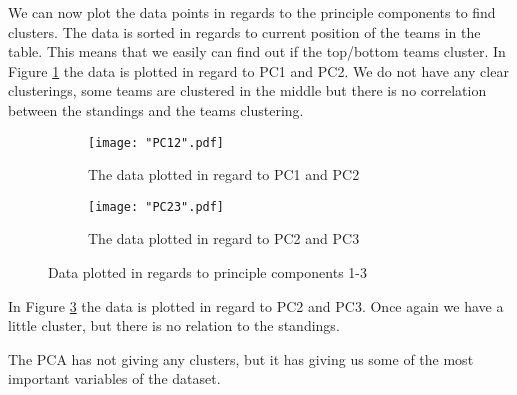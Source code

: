 \documentclass[Report.tex]{subfiles}
\begin{document}
We can now plot the data points in regards to the principle components to find clusters. The data is sorted in regards to current position of the teams in the table. This means that we easily can find out if the top/bottom teams cluster. In Figure \ref{fig:PC12} the data is plotted in regard to PC1 and PC2. We do not have any clear clusterings, some teams are clustered in the middle but there is no correlation between the standings and the teams clustering.

\begin{figure}
\center
\begin{subfigure}[b]{0.49\textwidth}
\texttt{[image: "PC12".pdf]}
\caption{The data plotted in regard to PC1 and PC2}
\label{fig:PC12}
\end{subfigure}
\begin{subfigure}[b]{0.49\textwidth}
\texttt{[image: "PC23".pdf]}
\caption{The data plotted in regard to PC2 and PC3}
\label{fig:PC23}
\end{subfigure}
\caption{Data plotted in regards to principle components 1-3}

\end{figure}
In Figure \ref{fig:PC23} the data is plotted in regard to PC2 and PC3. Once again we have a little cluster, but there is no relation to the standings.

The PCA has not giving any clusters, but it has giving us some of the most important variables of the dataset. 
\end{document}
